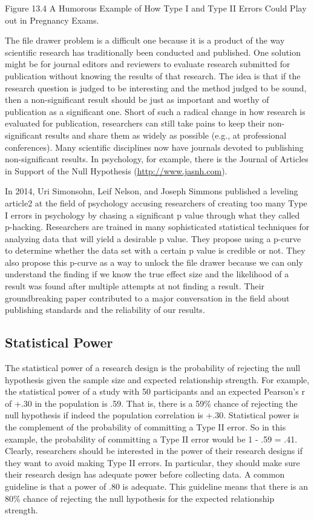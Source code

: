  

 
 Figure 13.4 A Humorous Example of How Type I and Type II Errors Could Play out in Pregnancy Exams.

 
The file drawer problem is a difficult one because it is a product of the way scientific research has traditionally been conducted and published. One solution might be for journal editors and reviewers to evaluate research submitted for publication without knowing the results of that research. The idea is that if the research question is judged to be interesting and the method judged to be sound, then a non-significant result should be just as important and worthy of publication as a significant one. Short of such a radical change in how research is evaluated for publication, researchers can still take pains to keep their non-significant results and share them as widely as possible (e.g., at professional conferences). Many scientific disciplines now have journals devoted to publishing non-significant results. In psychology, for example, there is the Journal of Articles in Support of the Null Hypothesis (\url{http://www.jasnh.com}).


In 2014, Uri Simonsohn, Leif Nelson, and Joseph Simmons published a leveling article2 at the field of psychology accusing researchers of creating too many Type I errors in psychology by chasing a significant p value through what they called p-hacking. Researchers are trained in many sophisticated statistical techniques for analyzing data that will yield a desirable p value. They propose using a p-curve to determine whether the data set with a certain p value is credible or not. They also propose this p-curve as a way to unlock the file drawer because we can only understand the finding if we know the true effect size and the likelihood of a result was found after multiple attempts at not finding a result. Their groundbreaking paper contributed to a major conversation in the field about publishing standards and the reliability of our results.


\subsection{Statistical Power}

The statistical power of a research design is the probability of rejecting the null hypothesis given the sample size and expected relationship strength. For example, the statistical power of a study with 50 participants and an expected Pearson's r of +.30 in the population is .59. That is, there is a 59\% chance of rejecting the null hypothesis if indeed the population correlation is +.30. Statistical power is the complement of the probability of committing a Type II error. So in this example, the probability of committing a Type II error would be 1 - .59 = .41. Clearly, researchers should be interested in the power of their research designs if they want to avoid making Type II errors. In particular, they should make sure their research design has adequate power before collecting data. A common guideline is that a power of .80 is adequate. This guideline means that there is an 80\% chance of rejecting the null hypothesis for the expected relationship strength.


